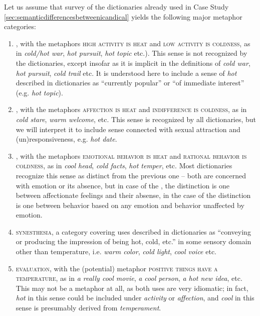 Let us assume that survey of the dictionaries already used in Case Study \ref{sec:semanticdifferencesbetweenicandical} yields the following major metaphor categories:

\begin{enumerate}

\item {}, with the metaphors \textsc{high activity is heat} and \textsc{low activity is coldness}, as in \textit{cold/hot war}, \textit{hot pursuit}, \textit{hot topic} etc.). This sense is not recognized by the dictionaries, except insofar as it is implicit in the definitions of \textit{cold war}, \textit{hot pursuit}, \textit{cold trail} etc. It is understood here to include a sense of \textit{hot} described in dictionaries as ``currently popular'' or ``of immediate interest'' (e.g. \textit{hot topic}).

\item {}, with the metaphors \textsc{affection is heat} and \textsc{indifference is coldness}, as in \textit{cold stare}, \textit{warm welcome}, etc. This sense is recognized by all dictionaries, but we will interpret it to include sense connected with sexual attraction and (un)responsiveness, e.g. \textit{hot date}.

\item {}, with the metaphors \textsc{emotional behavior is heat} and \textsc{rational behavior is coldness}, as in \textit{cool head}, \textit{cold facts}, \textit{hot temper}, etc. Most dictionaries recognize this sense as distinct from the previous one -- both are concerned with emotion or its absence, but in case of the , the distinction is one between affectionate feelings and their absense, in the case of  the distinction is one between behavior based on any emotion and behavior unaffected by emotion.

\item \textsc{synesthesia}, a category covering uses described in dictionaries as ``conveying or producing the impression of being hot, cold, etc.'' in some sensory domain other than temperature, i.e. \textit{warm color}, \textit{cold light}, \textit{cool voice} etc.

\item \textsc{evaluation}, with the (potential) metaphor \textsc{positive things have a temperature}, as in \textit{a really cool movie}, \textit{a cool person}, \textit{a hot new idea}, etc. This may not be a metaphor at all, as both uses are very idiomatic; in fact, \textit{hot} in this sense could be included under \textit{activity} or \textit{affection}, and \textit{cool} in this sense is presumably derived from \textit{temperament}.

\end{enumerate}

